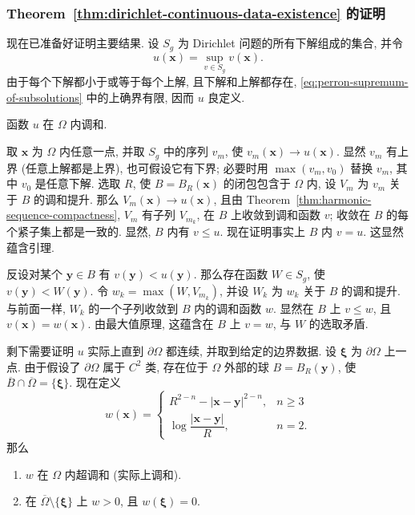 \subsubsection{Theorem~\ref{thm:dirichlet-continuous-data-existence} 的证明}\label{subsec:perron-existence-proof}

现在已准备好证明主要结果. 设 $S_g$ 为 Dirichlet 问题的所有下解组成的集合, 并令
\begin{equation}\label{eq:perron-supremum-of-subsolutions}
u(\bm{x})=\sup_{v\in S_g}v(\bm{x}).
\end{equation}
由于每个下解都小于或等于每个上解, 且下解和上解都存在, \eqref{eq:perron-supremum-of-subsolutions} 中的上确界有限, 因而 $u$ 良定义.

\begin{Lemma}
\label{lem:perron-envelope-harmonic}
函数 $u$ 在 $\Omega$ 内调和.
\end{Lemma}

\begin{Proof}
取 $\bm{x}$ 为 $\Omega$ 内任意一点, 并取 $S_g$ 中的序列 $v_m$, 使 $v_m(\bm{x})\to u(\bm{x})$. 显然 $v_m$ 有上界 (任意上解都是上界), 也可假设它有下界; 必要时用 $\max(v_m,v_0)$ 替换 $v_m$, 其中 $v_0$ 是任意下解. 选取 $R$, 使 $B=B_R(\bm{x})$ 的闭包包含于 $\Omega$ 内, 设 $V_m$ 为 $v_m$ 关于 $B$ 的调和提升. 那么 $V_m(\bm{x})\to u(\bm{x})$, 且由 Theorem~\ref{thm:harmonic-sequence-compactness}, $V_m$ 有子列 $V_{m_k}$, 在 $B$ 上收敛到调和函数 $v$; 收敛在 $B$ 的每个紧子集上都是一致的. 显然, $B$ 内有 $v\leq u$. 现在证明事实上 $B$ 内 $v=u$. 这显然蕴含引理.

反设对某个 $\bm{y}\in B$ 有 $v(\bm{y})<u(\bm{y})$. 那么存在函数 $W\in S_g$, 使 $v(\bm{y})<W(\bm{y})$. 令 $w_k=\max(W,V_{m_k})$, 并设 $W_k$ 为 $w_k$ 关于 $B$ 的调和提升. 与前面一样, $W_k$ 的一个子列收敛到 $B$ 内的调和函数 $w$. 显然在 $B$ 上 $v\leq w$, 且 $v(\bm{x})=w(\bm{x})$. 由最大值原理, 这蕴含在 $B$ 上 $v=w$, 与 $W$ 的选取矛盾.
\end{Proof}

剩下需要证明 $u$ 实际上直到 $\partial\Omega$ 都连续, 并取到给定的边界数据. 设 $\bm{\xi}$ 为 $\partial\Omega$ 上一点. 由于假设了 $\partial\Omega$ 属于 $C^2$ 类, 存在位于 $\Omega$ 外部的球 $B=B_R(\bm{y})$, 使 $\overline B\cap\overline\Omega=\{\bm{\xi}\}$. 现在定义
\begin{equation}\label{eq:perron-exterior-ball-barrier}
w(\bm{x})=\begin{cases}R^{2-n}-|\bm{x}-\bm{y}|^{2-n},&n\geq3\\\log\dfrac{|\bm{x}-\bm{y}|}{R},&n=2.\end{cases}
\end{equation}
那么
\begin{enumerate}
\item $w$ 在 $\Omega$ 内超调和 (实际上调和).
\item 在 $\overline\Omega\setminus\{\bm{\xi}\}$ 上 $w>0$, 且 $w(\bm{\xi})=0$.
\end{enumerate}

